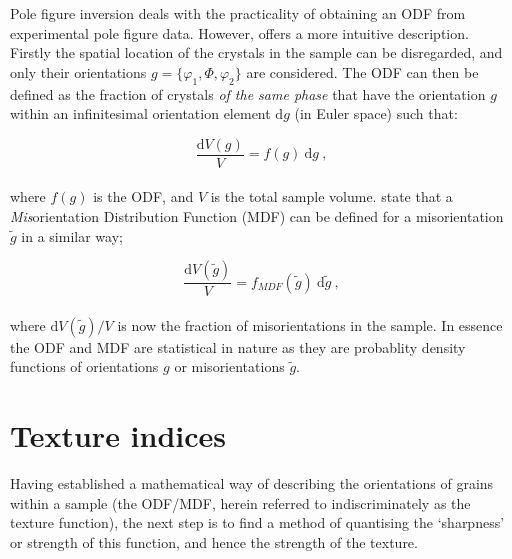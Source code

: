 \documentclass[a4paper,12pt]{report}
\numberwithin{equation}{chapter}
\begin{document}

Pole figure inversion deals with the practicality of obtaining an ODF from experimental pole figure data. However, \cite{bunge1982texture} offers a more intuitive description. Firstly the spatial location of the crystals in the sample can be disregarded, and only their orientations $g = \{\varphi_1,\Phi,\varphi_2\}$ are considered. The ODF can then be defined as the fraction of crystals \emph{of the same phase} that have the orientation $g$ within an infinitesimal orientation element $\mathrm{d}g$ (in Euler space) such that: 



\begin{equation}
\frac{\mathrm{d}V(g)}{V} = f(g)\ \mathrm{d}g\ ,
\end{equation}
\\
where $f(g)$ is the ODF, and $V$ is the total sample volume. \cite{Mainprice} state that a \emph{Mis}orientation Distribution Function (MDF) can be defined for a misorientation $\tilde{g}$ in a similar way;




\begin{equation}
\frac{\mathrm{d}V(\tilde{g})}{V} = f_{MDF}(\tilde{g})\ \mathrm{d}\tilde{g}\ ,
\end{equation}
\\
where $\mathrm{d}V(\tilde{g})/V$ is now the fraction of misorientations in the sample. In essence the ODF and MDF are statistical in nature as they are probablity density functions of orientations $g$ or misorientations $\tilde{g}$. 


\section{Texture indices} \label{sec:indicies}
Having established a mathematical way of describing the orientations of grains within a sample (the ODF/MDF, herein referred to indiscriminately as the texture function), the next step is to find a method of quantising the \lq{}sharpness\rq{} or strength of this function, and hence the strength of the texture.
\end{document}

